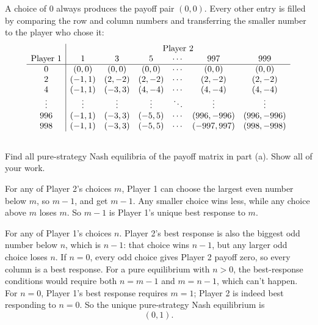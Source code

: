 \documentclass[newpages]{assignment}
\begin{document}
\begin{solution}
    A choice of \(0\) always produces the payoff pair \((0,0)\). Every other entry is filled
    by comparing the row and column numbers and transferring the smaller
    number to the player who chose it:
    \[
        \begin{array}{c|cccccc}
                   & \multicolumn{6}{c}{\text{Player 2}}                                                      \\
            \text{Player 1}
                   & 1                                   & 3      & 5      & \cdots & 997        & 999        \\
            \hline
            0      & (0,0)                               & (0,0)  & (0,0)  & \cdots & (0,0)      & (0,0)      \\
            2      & (-1,1)                              & (2,-2) & (2,-2) & \cdots & (2,-2)     & (2,-2)     \\
            4      & (-1,1)                              & (-3,3) & (4,-4) & \cdots & (4,-4)     & (4,-4)     \\
            \vdots & \vdots                              & \vdots & \vdots & \ddots & \vdots     & \vdots     \\
            996    & (-1,1)                              & (-3,3) & (-5,5) & \cdots & (996,-996) & (996,-996) \\
            998    & (-1,1)                              & (-3,3) & (-5,5) & \cdots & (-997,997) & (998,-998)
        \end{array}
    \]
\end{solution}

\subsection{}

\begin{problem}
    Find all pure-strategy Nash equilibria of the payoff matrix in part (a). Show all of your work.
\end{problem}

\begin{solution}
    For any of Player 2's choices \(m\), Player 1 can choose the largest even
    number below \(m\), so \(m-1\), and get \(m-1\). Any smaller
    choice wins less, while any choice above \(m\) loses \(m\).
    So \(m-1\) is Player 1's unique best response to \(m\).

    For any of Player 1's choices \(n\). Player 2's best response is also the
    biggest odd number below \(n\), which is \(n-1\): that choice wins
    \(n-1\), but any larger odd choice loses \(n\). If \(n=0\), every
    odd choice gives Player 2 payoff zero, so every column is a best
    response. For a pure equilibrium with \(n>0\), the best-response
    conditions would require both \(n=m-1\) and \(m=n-1\), which can't happen.
    For \(n=0\), Player 1's best response requires \(m=1\);
    Player 2 is indeed best responding to \(n=0\). So the unique
    pure-strategy Nash equilibrium is
    \[
        \boxed{(0,1)}.
    \]
\end{solution}
\end{document}
